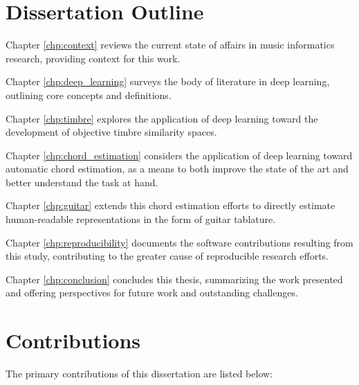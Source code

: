 \section{Dissertation Outline}
\label{sec:outline}
\begin{description}

\item Chapter \ref{chp:context} reviews the current state of affairs in music informatics research, providing context for this work.

\item Chapter \ref{chp:deep_learning} surveys the body of literature in deep learning, outlining core concepts and definitions.

\item Chapter \ref{chp:timbre} explores the application of deep learning toward the development of objective timbre similarity spaces.

\item Chapter \ref{chp:chord_estimation} considers the application of deep learning toward automatic chord estimation, as a means to both improve the state of the art and better understand the task at hand.

\item Chapter \ref{chp:guitar} extends this chord estimation efforts to directly estimate human-readable representations in the form of guitar tablature.

\item Chapter \ref{chp:reproducibility} documents the software contributions resulting from this study, contributing to the greater cause of reproducible research efforts.

\item Chapter \ref{chp:conclusion} concludes this thesis, summarizing the work presented and offering perspectives for future work and outstanding challenges.

\end{description}

\section{Contributions}
The primary contributions of this dissertation are listed below:

